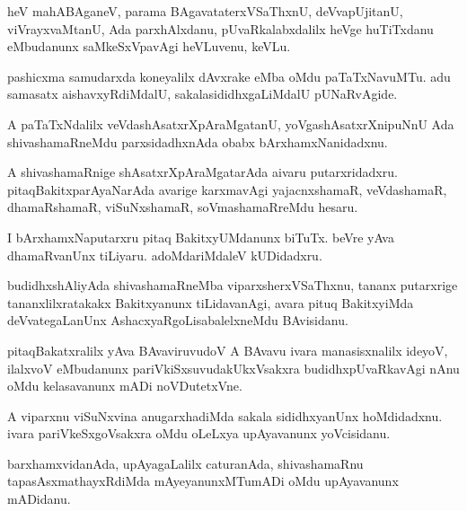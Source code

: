 \documentclass{article}
\begin{document}
\begin{mn}
heV mahABAganeV, parama BAgavataterxVSaThxnU, deVvapUjitanU,
viVrayxvaMtanU, Ada parxhAlxdanu, pUvaRkalabxdalilx heVge huTiTxdanu
eMbudanunx saMkeSxVpavAgi heVLuvenu, keVLu.
\end{mn}

\begin{mn}
pashicxma samudarxda koneyalilx dAvxrake eMba oMdu paTaTxNavuMTu. adu
 samasatx aishavxyRdiMdalU, sakalasididhxgaLiMdalU pUNaRvAgide.
\end{mn}

\begin{mn}
A paTaTxNdalilx veVdashAsatxrXpAraMgatanU, yoVgashAsatxrXnipuNnU 
 Ada shivashamaRneMdu parxsidadhxnAda obabx bArxhamxNanidadxnu.
\end{mn}

\begin{mn}
A shivashamaRnige shAsatxrXpAraMgatarAda aivaru putarxridadxru. 
pitaqBakitxparAyaNarAda avarige karxmavAgi 
yajacnxshamaR, veVdashamaR,
dhamaRshamaR, viSuNxshamaR, soVmashamaRreMdu hesaru. 
\end{mn}

\begin{mn}
I bArxhamxNaputarxru pitaq BakitxyUMdanunx biTuTx. beVre yAva	dhamaRvanUnx
tiLiyaru. adoMdariMdaleV kUDidadxru.	
\end{mn}

\begin{mn}
budidhxshAliyAda shivashamaRneMba viparxsherxVSaThxnu, tananx
putarxrige tananxlilxratakakx Bakitxyanunx tiLidavanAgi, 
avara pituq BakitxyiMda deVvategaLanUnx AshacxyaRgoLisabalelxneMdu 
BAvisidanu.
 \end{mn}
 
\begin{mn}
pitaqBakatxralilx yAva BAvaviruvudoV A BAvavu ivara manasisxnalilx 
ideyoV, ilalxvoV eMbudanunx pariVkiSxsuvudakUkxVsakxra budidhxpUvaRkavAgi
nAnu oMdu kelasavanunx mADi noVDutetxVne.
\end{mn}

\begin{mn}
A viparxnu viSuNxvina anugarxhadiMda sakala sididhxyanUnx 
hoMdidadxnu. ivara pariVkeSxgoVsakxra oMdu oLeLxya   upAyavanunx 
yoVcisidanu.
\end{mn}

\begin{mn}
barxhamxvidanAda, upAyagaLalilx caturanAda,
shivashamaRnu  tapasAsxmathayxRdiMda  mAyeyanunxMTumADi 
  oMdu  upAyavanunx  mADidanu.
\end{mn}
\end{document}
